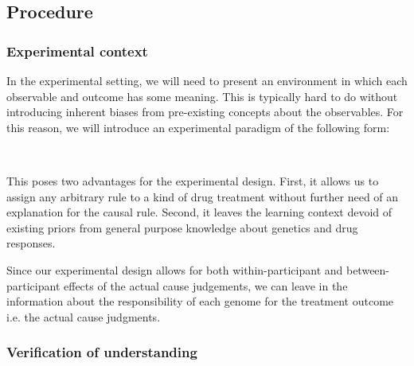 \documentclass[10pt,letterpaper]{article}
\begin{document}
\subsection*{Procedure}

\subsubsection*{Experimental context}

In the experimental setting, we will need to present an environment in which
each observable and outcome has some meaning. This is typically hard to do
without introducing inherent biases from pre-existing concepts about the
observables. For this reason, we will introduce an experimental paradigm of the following form:

\noindent{}
~

This poses two advantages for the experimental design. First, it allows us to assign any arbitrary rule to a kind of drug treatment without further need of an explanation for the causal rule. Second, it leaves the learning context devoid of existing priors from general purpose knowledge about genetics and drug responses. 

Since our experimental design allows for both within-participant and between-participant effects of the actual cause judgements, we can leave in the information about the responsibility of each genome for the treatment outcome i.e. the actual cause judgments.


\subsubsection*{Verification of understanding}
\end{document}
